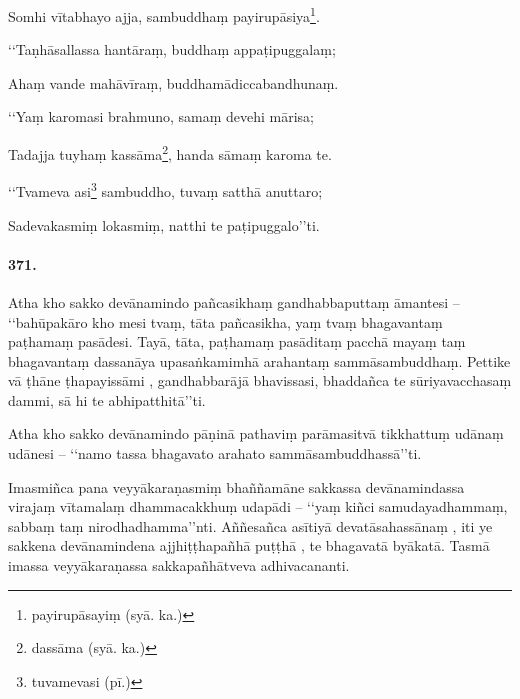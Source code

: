 Somhi vītabhayo ajja, sambuddhaṃ payirupāsiya\footnote{payirupāsayiṃ (syā. ka.)}.

‘‘Taṇhāsallassa hantāraṃ, buddhaṃ appaṭipuggalaṃ;

Ahaṃ vande mahāvīraṃ, buddhamādiccabandhunaṃ.

‘‘Yaṃ karomasi brahmuno, samaṃ devehi mārisa;

Tadajja tuyhaṃ kassāma\footnote{dassāma (syā. ka.)}, handa sāmaṃ karoma te.

‘‘Tvameva asi\footnote{tuvamevasi (pī.)} sambuddho, tuvaṃ satthā anuttaro;

Sadevakasmiṃ lokasmiṃ, natthi te paṭipuggalo’’ti.

\paragraph{371.} Atha kho sakko devānamindo pañcasikhaṃ gandhabbaputtaṃ āmantesi – ‘‘bahūpakāro kho mesi tvaṃ, tāta pañcasikha, yaṃ tvaṃ bhagavantaṃ paṭhamaṃ pasādesi. Tayā, tāta, paṭhamaṃ pasāditaṃ pacchā mayaṃ taṃ bhagavantaṃ dassanāya upasaṅkamimhā arahantaṃ sammāsambuddhaṃ. Pettike vā ṭhāne ṭhapayissāmi , gandhabbarājā bhavissasi, bhaddañca te sūriyavacchasaṃ dammi, sā hi te abhipatthitā’’ti.

Atha kho sakko devānamindo pāṇinā pathaviṃ parāmasitvā tikkhattuṃ udānaṃ udānesi – ‘‘namo tassa bhagavato arahato sammāsambuddhassā’’ti.

Imasmiñca pana veyyākaraṇasmiṃ bhaññamāne sakkassa devānamindassa virajaṃ vītamalaṃ dhammacakkhuṃ udapādi – ‘‘yaṃ kiñci samudayadhammaṃ, sabbaṃ taṃ nirodhadhamma’’nti. Aññesañca asītiyā devatāsahassānaṃ , iti ye sakkena devānamindena ajjhiṭṭhapañhā puṭṭhā , te bhagavatā byākatā. Tasmā imassa veyyākaraṇassa sakkapañhātveva adhivacananti.

